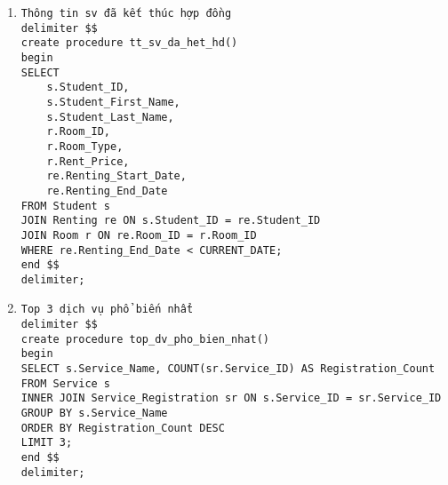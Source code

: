 \documentclass[a4paper,12pt]{article}
\begin{document}
\begin{enumerate}
\item \begin{verbatim}
Thông tin sv đã kết thúc hợp đồng
delimiter $$
create procedure tt_sv_da_het_hd()
begin
SELECT 
    s.Student_ID,
    s.Student_First_Name,
    s.Student_Last_Name,
    r.Room_ID,
    r.Room_Type,
    r.Rent_Price,
    re.Renting_Start_Date,
    re.Renting_End_Date
FROM Student s
JOIN Renting re ON s.Student_ID = re.Student_ID
JOIN Room r ON re.Room_ID = r.Room_ID
WHERE re.Renting_End_Date < CURRENT_DATE;
end $$
delimiter;
\end{verbatim}
\item \begin{verbatim}
Top 3 dịch vụ phổ biến nhẩt
delimiter $$
create procedure top_dv_pho_bien_nhat()
begin
SELECT s.Service_Name, COUNT(sr.Service_ID) AS Registration_Count
FROM Service s
INNER JOIN Service_Registration sr ON s.Service_ID = sr.Service_ID
GROUP BY s.Service_Name
ORDER BY Registration_Count DESC
LIMIT 3;
end $$
delimiter;
\end{verbatim}
\end{enumerate}
\end{document}
